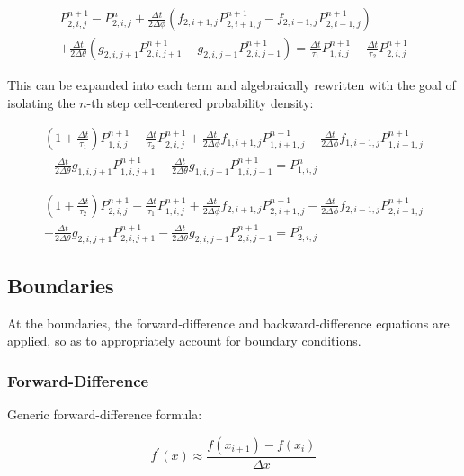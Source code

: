 \documentclass[12pt,a4paper,pagesize=pdftex]{scrartcl}
\begin{document}
\begin{multline*}
    P_{2,i,j}^{n+1} - P_{2,i,j}^n + \frac{\Delta t}{2 \Delta \phi} \left(f_{2,i+1,j}P^{n+1}_{2,i+1,j} - f_{2,i-1,j}P^{n+1}_{2,i-1,j}\right) \\+ \frac{\Delta t}{2 \Delta \theta} \left(g_{2,i,j+1} P^{n+1}_{2,i,j+1} - g_{2,i,j-1} P^{n+1}_{2,i,j-1}\right) = \frac{\Delta t}{\tau_1} P^{n+1}_{1,i,j} - \frac{\Delta t}{\tau_2}P^{n+1}_{2,i,j}
\end{multline*}

This can be expanded into each term and algebraically rewritten with the goal of isolating the \(n\)-th step cell-centered probability density:

\begin{multline*}
    \left(1 + \frac{\Delta t}{\tau_1}\right) P^{n+1}_{1,i,j} - \frac{\Delta t}{\tau_2} P^{n+1}_{2,i,j} + \frac{\Delta t}{2 \Delta \phi} f_{1,i+1,j}P^{n+1}_{1,i+1,j} - \frac{\Delta t}{2 \Delta \phi} f_{1,i-1,j}P^{n+1}_{1,i-1,j} \\+ \frac{\Delta t}{2 \Delta \theta} g_{1,i,j+1} P^{n+1}_{1,i,j+1} - \frac{\Delta t}{2\Delta \theta} g_{1,i,j-1} P^{n+1}_{1,i,j-1} = P^n_{1,i,j}
\end{multline*}

\begin{multline*}
    \left(1 + \frac{\Delta t}{\tau_2}\right) P^{n+1}_{2,i,j} - \frac{\Delta t}{\tau_1} P^{n+1}_{1,i,j} + \frac{\Delta t}{2 \Delta \phi} f_{2,i+1,j}P^{n+1}_{2,i+1,j} - \frac{\Delta t}{2 \Delta \phi} f_{2,i-1,j}P^{n+1}_{2,i-1,j} \\+ \frac{\Delta t}{2 \Delta \theta} g_{2,i,j+1} P^{n+1}_{2,i,j+1} - \frac{\Delta t}{2\Delta \theta} g_{2,i,j-1} P^{n+1}_{2,i,j-1} = P^n_{2,i,j}
\end{multline*}

\subsection*{Boundaries}
At the boundaries, the forward-difference and backward-difference equations are applied, so as to appropriately account for boundary conditions.

\subsubsection*{Forward-Difference}
Generic forward-difference formula:

\begin{equation*}
    f^\prime\left(x\right) \approx \frac{f\left(x_{i+1}\right) - f\left(x_i\right)}{\Delta x}
\end{equation*}
\end{document}
